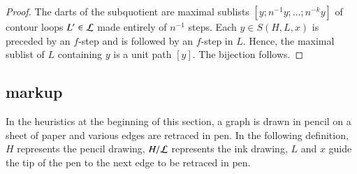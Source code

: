 \begin{proof} The darts of the subquotient are maximal sublists
  $[y;n^{-1} y;\ldots;n^{-k} y]$ of contour loops $L'\in {\cal L}$
  made entirely of $n^{-1}$ steps.  Each $y\in S(H,L,x)$ is preceded
  by an $f$-step and is followed by an $f$-step in $L$.  Hence, the
  maximal sublist of $L$ containing $y$ is a unit path $[y]$.  The
  bijection follows.
\end{proof}


\subsection{markup}\label{sec:face-insert}
%




In the heuristics at the beginning of this section, a graph is drawn in pencil
on a sheet of paper and various edges are retraced in pen.  In the following
definition, $H$ represents the pencil drawing, $H/{\cal L}$ represents the ink
drawing,  $L$ and $x$ guide the tip of the pen to the next edge to be retraced in pen.


